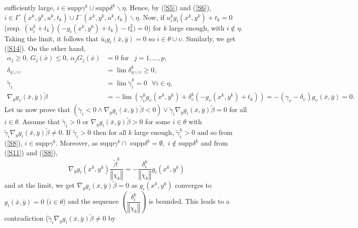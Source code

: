 	sufficiently large, $i\in\mathrm{supp}\gamma^{k}\cup\mathrm{supp}\delta
	^{k}\backslash\eta.$ Hence, by (\ref{S5}) and (\ref{S6}), $i\in
	I^{+}(x^{k},y^{k},u^{k},t_{k})\cup I^{-}(x^{k},y^{k},u^{k},t_{k})\backslash\eta$.  Now, if
	$u_{i}^{k}g_{i}(x^{k},y^{k})+t_{k}=0$ (resp. $(u_{i}^{k}+t_{k})(-g_{i}(x^{k},y^{k})+t_{k})-t_{k}^{2})=0$) for $k$ large enough, with
	$i\notin\eta.$ Taking the limit, it follows that $\bar{u}_{i}g_{i}(\bar
	{x},\bar{y})=0$ so $i\in\theta\cup\upsilon.$ Similarly, we get (\ref{S14}). On the
	other hand, 
	\begin{align*}
    \alpha_{j} \geq0, \,G_{j}(\bar{x})\leq0, \,\alpha_{j}G_{j}(\bar{x}
	) & =0  \mbox{ for }\;\, j=1,\ldots,p,\\
	\delta_{\eta\cup\upsilon} &  =\lim\delta_{\eta\cup\upsilon}^{k}\geq0,\\
	\tilde{\gamma}_{i} &  =\lim\tilde{\gamma}_{i}^{k}=0\text{ \ \ }\forall i\in\eta,\\
	\nabla_{y}g_{\upsilon}(\bar{x},\bar{y})\tilde{\beta} & = -\lim\left( \gamma_{\upsilon}^{k}g_{\upsilon}(x^{k},y^{k})+\delta _{\upsilon}^{k}(-g_{\upsilon}(x^{k},y^{k})+t_{k})\right)
	=-\left( \gamma_{\upsilon}-\delta_{\upsilon}\right) g_{\upsilon}(\bar{x},\bar{y})=0.
	\end{align*}
	Let us now prove that
	$
	(\tilde{\gamma}_{i}<0\wedge\nabla_{y}g_{i}(\bar{x},\bar{y})\tilde{\beta
	}<0)\vee\tilde{\gamma}_{i}\nabla_{y}g_{i}(\bar{x},\bar{y})\tilde{\beta}=0
	$
	for all $i\in\theta.$ Assume that $\tilde{\gamma}_{i}>0$ or $\nabla_{y}
	g_{i}(\bar{x},\bar{y})\tilde{\beta}>0$ for some $i\in\theta$ with
	$\tilde{\gamma}_{i}\nabla_{y}g_{i}(\bar{x},\bar{y})\tilde{\beta}\neq0.$ If
	$\tilde{\gamma}_{i}>0$ then for all $k$ large enough, $\tilde{\gamma}_{i}
	^{k}>0$ and so from (\ref{S8}), $i\in\mathrm{supp}\gamma^{k}$. Moreover, as
	$\mathrm{supp}\gamma^{k}\cap$ \textrm{supp}$\delta^{k}=\emptyset,$
	$i\notin\mathrm{supp}\delta^{k}$ and from (\ref{S11}) and (\ref{S8}),
	\[
	\nabla_{y}g_{i}(x^{k},y^{k})\frac{\tilde{\beta}^{k}}{\left\Vert \chi
		_{k}\right\Vert }=-\frac{\delta_{i}^{k}}{\left\Vert \chi_{k}\right\Vert }
	g_{i}(x^{k},y^{k})
	\]
	and at the limit, we get $\nabla_{y}g_{i}(\bar{x},\bar{y})\tilde{\beta
	}=0$ as $g_{i}(x^{k},y^{k})$ converges to $g_{i}(\bar{x},\bar{y})=0$
	($i\in\theta$) and the sequence $\left(\dfrac{\delta_{i}^{k}}{\left\Vert \chi
		_{k}\right\Vert}\right)$ is bounded. This leads to a contradiction ($\tilde{\gamma}_{i}\nabla_{y}g_{i}(\bar{x},\bar{y})\tilde{\beta}\neq0$ by
